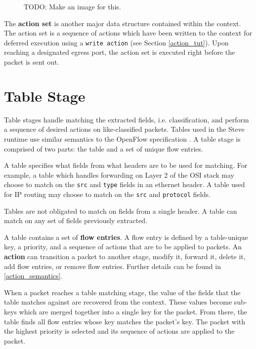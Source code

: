 \begin{figure}
TODO: Make an image for this.
\label{fg:ContextEnv}
\end{figure}

The \textbf{action set} is another major data structure contained within the context. The action set is a sequence of actions which have been written to the context for deferred execution using a \texttt{write action} (see Section \ref{action_tut}). Upon reaching a designated egress port, the action set is executed right before the packet is sent out.

\section{Table Stage} \label{table_desc}

Table stages handle matching the extracted fields, i.e. classification, and perform a sequence of desired actions on like-classified packets. Tables used in the Steve runtime use similar semantics to the OpenFlow specification \cite{openflow_spec}. A table stage is comprised of two parts: the table and a set of unique flow entries.

A table specifies what fields from what headers are to be used for matching. For example, a table which handles forwarding on Layer 2 of the OSI stack may choose to match on the \texttt{src} and \texttt{type} fields in an ethernet header. A table used for IP routing may choose to match on the \texttt{src} and \texttt{protocol} fields. 

Tables are not obligated to match on fields from a single header. A table can match on any set of fields previously extracted.

A table contains a set of \textbf{flow entries}. A flow entry is defined by a table-unique key, a priority, and a sequence of actions that are to be applied to packets. An \textbf{action} can transition a packet to another stage, modify it, forward it, delete it, add flow entries, or remove flow entries. Further details can be found in \ref{action_semantics}.

When a packet reaches a table matching stage, the value of the fields that the table matches against are recovered from the context. These values become sub-keys which are merged together into a single key for the packet. From there, the table finds all flow entries whose key matches the packet's key. The packet with the highest priority is selected and its sequence of actions are applied to the packet.

